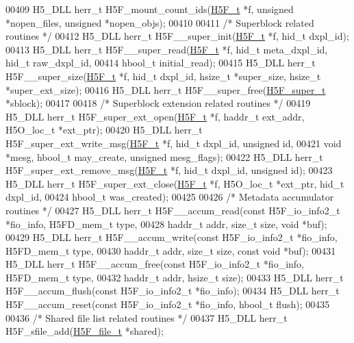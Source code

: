 \begin{DoxyCode}
00409 H5\_DLL herr\_t H5F\_mount\_count\_ids(\hyperlink{struct_h5_f__t}{H5F\_t} *f, \textcolor{keywordtype}{unsigned} *nopen\_files, \textcolor{keywordtype}{unsigned} *nopen\_objs);
00410 
00411 \textcolor{comment}{/* Superblock related routines */}
00412 H5\_DLL herr\_t H5F\_\_super\_init(\hyperlink{struct_h5_f__t}{H5F\_t} *f, hid\_t dxpl\_id);
00413 H5\_DLL herr\_t H5F\_\_super\_read(\hyperlink{struct_h5_f__t}{H5F\_t} *f, hid\_t meta\_dxpl\_id, hid\_t raw\_dxpl\_id,
00414     hbool\_t initial\_read);
00415 H5\_DLL herr\_t H5F\_\_super\_size(\hyperlink{struct_h5_f__t}{H5F\_t} *f, hid\_t dxpl\_id, hsize\_t *super\_size, hsize\_t *super\_ext\_size);
00416 H5\_DLL herr\_t H5F\_\_super\_free(\hyperlink{struct_h5_f__super__t}{H5F\_super\_t} *sblock);
00417 
00418 \textcolor{comment}{/* Superblock extension related routines */}
00419 H5\_DLL herr\_t H5F\_super\_ext\_open(\hyperlink{struct_h5_f__t}{H5F\_t} *f, haddr\_t ext\_addr, H5O\_loc\_t *ext\_ptr);
00420 H5\_DLL herr\_t H5F\_super\_ext\_write\_msg(\hyperlink{struct_h5_f__t}{H5F\_t} *f, hid\_t dxpl\_id, \textcolor{keywordtype}{unsigned} \textcolor{keywordtype}{id},
00421     \textcolor{keywordtype}{void} *mesg, hbool\_t may\_create, \textcolor{keywordtype}{unsigned} mesg\_flags);
00422 H5\_DLL herr\_t H5F\_super\_ext\_remove\_msg(\hyperlink{struct_h5_f__t}{H5F\_t} *f, hid\_t dxpl\_id, \textcolor{keywordtype}{unsigned} \textcolor{keywordtype}{id});
00423 H5\_DLL herr\_t H5F\_super\_ext\_close(\hyperlink{struct_h5_f__t}{H5F\_t} *f, H5O\_loc\_t *ext\_ptr, hid\_t dxpl\_id,
00424     hbool\_t was\_created);
00425 
00426 \textcolor{comment}{/* Metadata accumulator routines */}
00427 H5\_DLL herr\_t H5F\_\_accum\_read(\textcolor{keyword}{const} H5F\_io\_info2\_t *fio\_info, H5FD\_mem\_t type,
00428     haddr\_t addr, \textcolor{keywordtype}{size\_t} size, \textcolor{keywordtype}{void} *buf);
00429 H5\_DLL herr\_t H5F\_\_accum\_write(\textcolor{keyword}{const} H5F\_io\_info2\_t *fio\_info, H5FD\_mem\_t type,
00430     haddr\_t addr, \textcolor{keywordtype}{size\_t} size, \textcolor{keyword}{const} \textcolor{keywordtype}{void} *buf);
00431 H5\_DLL herr\_t H5F\_\_accum\_free(\textcolor{keyword}{const} H5F\_io\_info2\_t *fio\_info, H5FD\_mem\_t type,
00432     haddr\_t addr, hsize\_t size);
00433 H5\_DLL herr\_t H5F\_\_accum\_flush(\textcolor{keyword}{const} H5F\_io\_info2\_t *fio\_info);
00434 H5\_DLL herr\_t H5F\_\_accum\_reset(\textcolor{keyword}{const} H5F\_io\_info2\_t *fio\_info, hbool\_t flush);
00435 
00436 \textcolor{comment}{/* Shared file list related routines */}
00437 H5\_DLL herr\_t H5F\_sfile\_add(\hyperlink{struct_h5_f__file__t}{H5F\_file\_t} *shared);

\end{DoxyCode}
